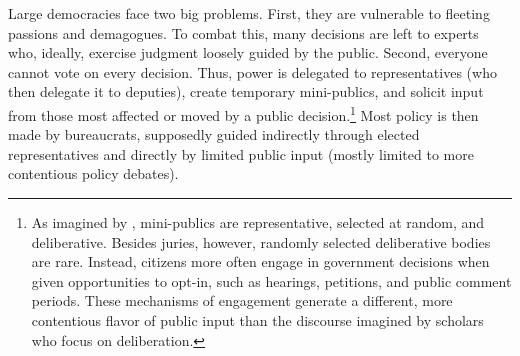 
Large democracies face two big problems. First, they are vulnerable to fleeting passions and demagogues. To combat this, many decisions are left to experts who, ideally, %
exercise judgment loosely guided by the public. Second, everyone cannot vote on every decision. Thus, power is delegated to representatives (who then delegate it to deputies), create temporary mini-publics, and solicit input from those most affected or moved by a public decision.\footnote{
As imagined by \citet{Dahl1989}, mini-publics are representative, selected at random, and deliberative. Besides juries, however, randomly selected deliberative bodies are rare. Instead, citizens more often engage in government decisions when given opportunities to opt-in, such as hearings, petitions, and public comment periods. These mechanisms of engagement generate a different, more contentious flavor of public input than the discourse imagined by scholars who focus on deliberation.
}
Most policy is then made by bureaucrats, supposedly guided indirectly through elected representatives and directly by limited public input (mostly limited to more contentious policy debates).




